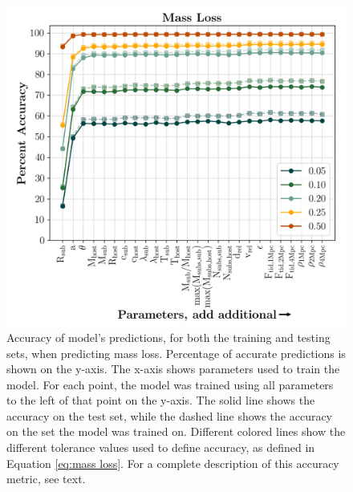 \documentclass[fleqn,usenatbib]{mnras}
\begin{document}
\begin{figure}
	\includegraphics[width=\columnwidth]{Figures/massloss_predictions}
	\vspace{-15pt}
    \caption{Accuracy of model's predictions, for both the training and testing sets, when predicting mass loss. Percentage of accurate predictions is shown on the y-axis. The x-axis shows parameters used to train the model. For each point, the model was trained using all parameters to the left of that point on the y-axis. The solid line shows the accuracy on the test set, while the dashed line shows the accuracy on the set the model was trained on. Different colored lines show the different tolerance values used to define accuracy, as defined in Equation \ref{eq:mass loss}. For a complete description of this accuracy metric, see text.}
    \label{fig:massloss_predictions}
\end{figure}
\end{document}

